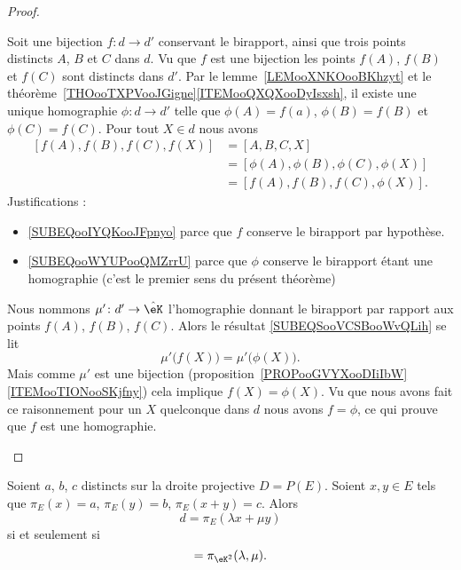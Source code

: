 \begin{proof}
\begin{subproof}
		\spitem[\( \Leftarrow\)]

		Soit une bijection \( f\colon d\to d'\) conservant le birapport, ainsi que trois points distincts \( A\), \( B\) et \( C\) dans \( d\). Vu que \( f\) est une bijection les points \( f(A)\), \( f(B)\) et \( f(C)\) sont distincts dans \( d'\). Par le lemme~\ref{LEMooXNKOooBKhzyt} et le théorème~\ref{THOooTXPVooJGigne}\ref{ITEMooQXQXooDyIsxsh}, il existe une unique homographie \( \phi\colon d\to d'\) telle que \( \phi(A)=f(a)\), \( \phi(B)=f(B)\) et \( \phi(C)=f(C)\). Pour tout \( X\in d\) nous avons
		\begin{subequations}        \label{SUBEQSooVCSBooWvQLih}
			\begin{align}
				[f(A),f(B),f(C),f(X)] & =[A,B,C,X]   \label{SUBEQooIYQKooJFpnyo}                           \\
				                      & =[\phi(A),\phi(B),\phi(C),\phi(X)]     \label{SUBEQooWYUPooQMZrrU} \\
				                      & =[f(A),f(B),f(C),\phi(X)].
			\end{align}
		\end{subequations}
		Justifications :
		\begin{itemize}
			\item \eqref{SUBEQooIYQKooJFpnyo} parce que \( f\) conserve le birapport par hypothèse.
			\item \eqref{SUBEQooWYUPooQMZrrU} parce que \( \phi\) conserve le birapport étant une homographie (c'est le premier sens du présent théorème)
		\end{itemize}
		Nous nommons \( \mu'\colon d'\to \hat\eK\) l'homographie donnant le birapport par rapport aux points \( f(A)\), \( f(B)\), \( f(C)\). Alors le résultat \eqref{SUBEQSooVCSBooWvQLih} se lit
		\begin{equation}
			\mu'\big( f(X) \big)=\mu'\big( \phi(X) \big).
		\end{equation}
		Mais comme \( \mu'\) est une bijection (proposition~\ref{PROPooGVYXooDIiIbW}\ref{ITEMooTIONooSKjfny}) cela implique \( f(X)=\phi(X)\). Vu que nous avons fait ce raisonnement pour un \( X\) quelconque dans \( d\) nous avons \( f=\phi\), ce qui prouve que \( f\) est une homographie.
	\end{subproof}
\end{proof}

\begin{lemma}
	Soient \( a\), \( b\), \( c\) distincts sur la droite projective \( D=P(E)\). Soient \( x,y\in E\) tels que \( \pi_E(x)=a\), \( \pi_E(y)=b\), \( \pi_E(x+y)=c\). Alors
	\begin{equation}
		d=\pi_E(\lambda x+\mu y)
	\end{equation}
	si et seulement si
	\begin{equation}
		[a,b,c,d]=\pi_{\eK^2}(\lambda,\mu).
	\end{equation}
\end{lemma}

